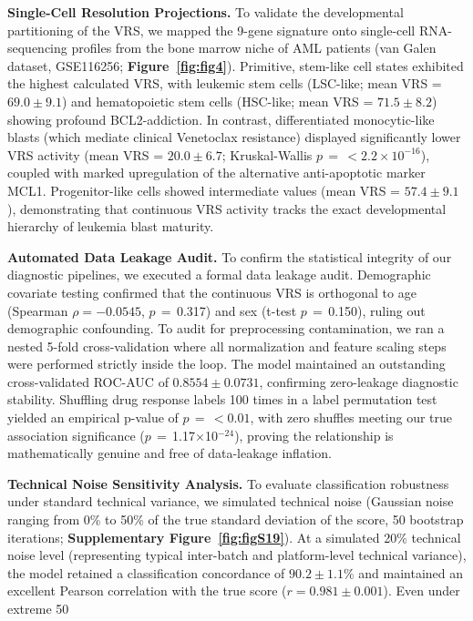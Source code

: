 \documentclass[11pt,a4paper]{article}
\newcommand{\pval}[1]{$p$\,$=$\,#1}
\begin{document}
\textbf{Single-Cell Resolution Projections.} To validate the developmental partitioning of the VRS, we mapped the 9-gene signature onto single-cell RNA-sequencing profiles from the bone marrow niche of AML patients (van Galen dataset, GSE116256; \textbf{Figure~\ref{fig:fig4}}). Primitive, stem-like cell states exhibited the highest calculated VRS, with leukemic stem cells (LSC-like; mean VRS = $69.0 \pm 9.1$) and hematopoietic stem cells (HSC-like; mean VRS = $71.5 \pm 8.2$) showing profound BCL2-addiction. In contrast, differentiated monocytic-like blasts (which mediate clinical Venetoclax resistance) displayed significantly lower VRS activity (mean VRS = $20.0 \pm 6.7$; Kruskal-Wallis \pval{$< 2.2 \times 10^{-16}$}), coupled with marked upregulation of the alternative anti-apoptotic marker MCL1. Progenitor-like cells showed intermediate values (mean VRS = $57.4 \pm 9.1$), demonstrating that continuous VRS activity tracks the exact developmental hierarchy of leukemia blast maturity.

\textbf{Automated Data Leakage Audit.} To confirm the statistical integrity of our diagnostic pipelines, we executed a formal data leakage audit. Demographic covariate testing confirmed that the continuous VRS is orthogonal to age (Spearman $\rho = -0.0545$, \pval{0.317}) and sex (t-test \pval{0.150}), ruling out demographic confounding. To audit for preprocessing contamination, we ran a nested 5-fold cross-validation where all normalization and feature scaling steps were performed strictly inside the loop. The model maintained an outstanding cross-validated ROC-AUC of $0.8554 \pm 0.0731$, confirming zero-leakage diagnostic stability. Shuffling drug response labels 100 times in a label permutation test yielded an empirical p-value of \pval{$< 0.01$}, with zero shuffles meeting our true association significance (\pval{1.17$\times$10$^{-24}$}), proving the relationship is mathematically genuine and free of data-leakage inflation.

\textbf{Technical Noise Sensitivity Analysis.} To evaluate classification robustness under standard technical variance, we simulated technical noise (Gaussian noise ranging from 0\% to 50\% of the true standard deviation of the score, 50 bootstrap iterations; \textbf{Supplementary Figure~\ref{fig:figS19}}). At a simulated 20\% technical noise level (representing typical inter-batch and platform-level technical variance), the model retained a classification concordance of $90.2 \pm 1.1\%$ and maintained an excellent Pearson correlation with the true score ($r = 0.981 \pm 0.001$). Even under extreme 50%
\end{document}
